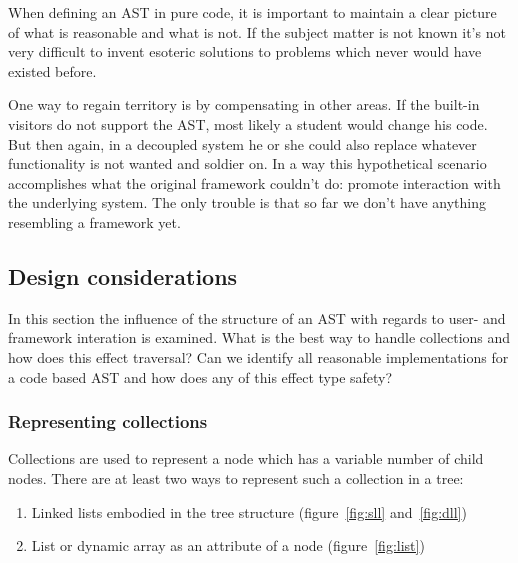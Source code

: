 \documentclass[final,a4paper,12pt]{article}
\begin{document}
When defining an AST in pure code, it is important to maintain a clear picture of what is reasonable and what is not. If the subject matter is not known it's not very difficult to invent esoteric solutions to problems which never would have existed before.

One way to regain territory is by compensating in other areas. If the built-in visitors do not support the AST, most likely a student would change his code. But then again, in a decoupled system he or she could also replace whatever functionality is not wanted and soldier on. In a way this hypothetical scenario accomplishes what the original framework couldn't do: promote interaction with the underlying system. The only trouble is that so far we don't have anything resembling a framework yet.

\subsection{Design considerations}
In this section the influence of the structure of an AST with regards to user- and framework interation is examined. What is the best way to handle collections and how does this effect traversal? Can we identify all reasonable implementations for a code based AST and how does any of this effect type safety?

\subsubsection{Representing collections}
Collections are used to represent a node which has a variable number of child nodes. There are at least two ways to represent such a collection in a tree:
\begin{enumerate}
	\item Linked lists embodied in the tree structure (figure~\ref{fig:sll} and~\ref{fig:dll})
	\item List or dynamic array as an attribute of a node (figure~\ref{fig:list})
\end{enumerate}
\end{document}
